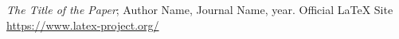 
\thispagestyle{empty} %
\begin{thebibliography}{99}

\emph{The Title of the Paper}; Author Name, Journal Name, year. %
Official LaTeX Site \\ \url{https://www.latex-project.org/} %

\end{thebibliography}